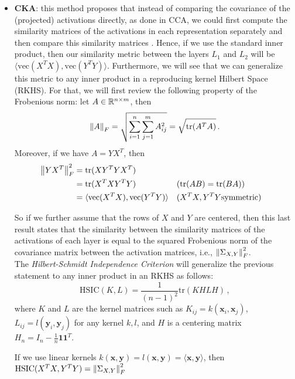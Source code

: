 \documentclass[../main.tex]{subfiles}
\begin{document}
\begin{itemize}
    \item \textbf{CKA}: this method proposes that instead of comparing the covariance of the (projected) activations directly, as done in CCA, we could first compute the similarity matrices of the activations in each representation separately and then compare this similarity matrices \cite{kornblith_similarity_2019}. Hence, if we use the standard inner product, then our similarity metric between the layers $L_1$ and $L_2$ will be $\langle \text{vec}(X^T X), \text{vec}(Y^T Y) \rangle$. Furthermore, we will see that we can generalize this metric to any inner product in a reproducing kernel Hilbert Space (RKHS). For that, we will first review the following property of the Frobenious norm: let $A \in \mathbb{R}^{n \times m}$, then
    \[
    \left\lVert A \right\rVert_F = \sqrt{\sum_{i=1}^n\sum_{j=1}^m A_{ij}^2} = \sqrt{\text{tr}(A^TA)}\,.
    \]
    Moreover, if we have $A=Y X^T$, then
    \begin{align*}
    \left\lVert Y X^T \right\rVert_F^2 &= \text{tr}(X Y^T Y X^T) \\
    &= \text{tr}(X^T X Y^T Y) &&(\text{tr}(AB) = \text{tr}(BA))\\
    &= \langle \text{vec}(X^TX), \text{vec}(Y^TY) \rangle && (X^TX, Y^TY \text{symmetric})
    \end{align*}
    
    So if we further assume that the rows of $X$ and $Y$ are centered, then this last result states that the similarity between the similarity matrices of the activations of each layer is equal to the squared Frobenious norm of the covariance matrix between the activation matrices, i.e., $\left\lVert \Sigma_{X, Y} \right\rVert_F^2$.\\

    The \emph{Hilbert-Schmidt Independence Criterion} \cite{gretton_measuring_2005} will generalize the previous statement to any inner product in an RKHS as follows:
    \[
    \text{HSIC}(K, L) = \frac{1}{(n-1)^2}\text{tr}(KHLH)\,,
    \]
    where $K$ and $L$ are the kernel matrices such as $K_{ij}=k(\mathbf{x}_i, \mathbf{x}_j)$, $L_{ij}=l(\mathbf{y}_i, \mathbf{y}_j)$ for any kernel $k,l$, and $H$ is a centering matrix $H_n= I_n - \frac{1}{n}\mathbf{1}\mathbf{1}^T$. 

    \begin{remark}
        If we use linear kernels $k(\mathbf{x}, \mathbf{y})=l(\mathbf{x}, \mathbf{y})=\langle\mathbf{x}, \mathbf{y}\rangle$, then $\text{HSIC}(X^T X,Y^T Y) = \left\lVert \Sigma_{X, Y} \right\rVert_F^2$
    \end{remark}


\end{itemize}
\end{document}
